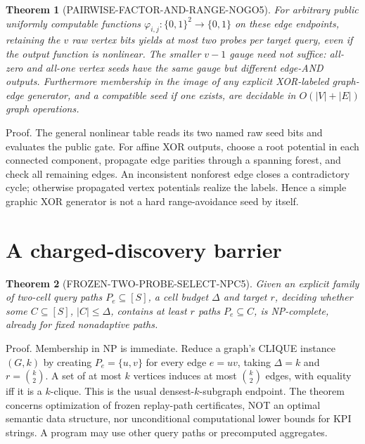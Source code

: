 \documentclass[11pt]{article}
\newtheorem{theorem}{Theorem}
\begin{document}
\begin{theorem}[PAIRWISE-FACTOR-AND-RANGE-NOGO5]
For arbitrary public uniformly computable functions \(\varphi_{i,j}:\{0,1\}^2\to\{0,1\}\) on these edge endpoints, retaining the \(v\) raw vertex bits yields at most two probes per target query, even if the output function is nonlinear. The smaller \(v-1\) gauge need not suffice: all-zero and all-one vertex seeds have the same gauge but different edge-AND outputs. Furthermore membership in the image of any explicit XOR-labeled graph-edge generator, and a compatible seed if one exists, are decidable in \(O(|V|+|E|)\) graph operations.
\end{theorem}
\noindent Proof. The general nonlinear table reads its two named raw seed bits and evaluates the public gate. For affine XOR outputs, choose a root potential in each connected component, propagate edge parities through a spanning forest, and check all remaining edges. An inconsistent nonforest edge closes a contradictory cycle; otherwise propagated vertex potentials realize the labels. Hence a simple graphic XOR generator is not a hard range-avoidance seed by itself.

\section{A charged-discovery barrier}
\begin{theorem}[FROZEN-TWO-PROBE-SELECT-NPC5]
Given an explicit family of two-cell query paths \(P_e\subseteq[S]\), a cell budget \(\Delta\) and target \(r\), deciding whether some \(C\subseteq[S]\), \(|C|\le\Delta\), contains at least \(r\) paths \(P_e\subseteq C\), is NP-complete, already for fixed nonadaptive paths.
\end{theorem}
\noindent Proof. Membership in NP is immediate. Reduce a graph's CLIQUE instance \((G,k)\) by creating \(P_e=\{u,v\}\) for every edge \(e=uv\), taking \(\Delta=k\) and \(r={k\choose2}\). A set of at most \(k\) vertices induces at most \({k\choose2}\) edges, with equality iff it is a \(k\)-clique. This is the usual densest-\(k\)-subgraph endpoint. The theorem concerns optimization of frozen replay-path certificates, NOT an optimal semantic data structure, nor unconditional computational lower bounds for KPI strings. A program may use other query paths or precomputed aggregates.
\end{document}

